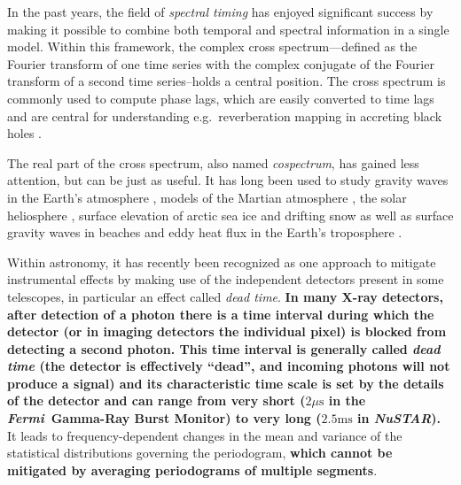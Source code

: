 \documentclass[12pt]{emulateapj}
\newcommand{\project}[1]{\textsl{#1}}
\newcommand{\nustar}{\project{NuSTAR}\xspace}
\newcommand{\fermi}{\project{Fermi}\xspace}
\begin{document}
In the past years, the field of \textit{spectral timing} has enjoyed significant success by making it possible to combine both temporal and spectral information in a single model. Within this framework, the complex cross spectrum---defined as the Fourier transform of one time series with the complex conjugate of the Fourier transform of a second time series--holds a central position. The cross spectrum is commonly used to compute phase lags, which are easily converted to time lags and are central for understanding e.g.\ reverberation mapping in accreting black holes \citep[see][for a recent review]{uttley2014}. 

The real part of the cross spectrum, also named \textit{cospectrum}, has gained less attention, but can be just as useful. It has long been used to study gravity waves in the Earth's atmosphere \citep[e.g.][]{john2016}, models of the Martian atmosphere \citep[e.g.][]{wang2016}, the solar heliosphere \citep[e.g.][]{vigeesh2017}, surface elevation of arctic sea ice \citep[e.g.][]{ardhuin2016} and drifting snow \citep[e.g.][]{paterna2016} as well as surface gravity waves in beaches \citep[e.g.][]{fiedler2015} and eddy heat flux in the Earth's troposphere \citep[e.g.][]{wang2015,zurita-gotor2017}.

Within astronomy, it has recently been recognized as one approach to mitigate instrumental effects by making use of the independent detectors present in some telescopes, in particular an effect called \textit{dead time}.  \textbf{In many X-ray detectors, after detection of a photon there is a time interval during which the detector (or in imaging detectors the individual pixel) is blocked from detecting a second photon. This time interval is generally called \textit{dead time} (the detector is effectively ``dead'', and incoming photons will not produce a signal) and its characteristic time scale is set by the details of the detector and can range from very short ($2\mu\mathrm{s}$ in the \fermi\ Gamma-Ray Burst Monitor) to very long ($2.5\mathrm{ms}$ in \nustar).} It leads to frequency-dependent changes in the mean and variance of the statistical distributions governing the periodogram, \textbf{which cannot be mitigated by averaging periodograms of multiple segments}.
\end{document}
